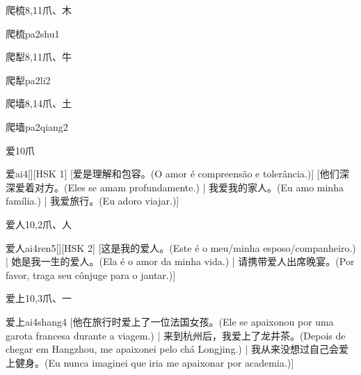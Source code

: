 \begin{entry}{爬梳}{8,11}{⽖、⽊}
  \begin{phonetics}{爬梳}{pa2shu1}
  \end{phonetics}
\end{entry}

\begin{entry}{爬犁}{8,11}{⽖、⽜}
  \begin{phonetics}{爬犁}{pa2li2}
  \end{phonetics}
\end{entry}

\begin{entry}{爬墙}{8,14}{⽖、⼟}
  \begin{phonetics}{爬墙}{pa2qiang2}
  \end{phonetics}
\end{entry}

\begin{entry}{爱}{10}{⽖}
  \begin{phonetics}{爱}{ai4}[][HSK 1]
    [爱是理解和包容。(O amor é compreensão e tolerância.)]
    [他们深深爱着对方。(Eles se amam profundamente.) | 我爱我的家人。(Eu amo minha família.) | 我爱旅行。(Eu adoro viajar.)]
  \end{phonetics}
\end{entry}

\begin{entry}{爱人}{10,2}{⽖、⼈}
  \begin{phonetics}{爱人}{ai4ren5}[][HSK 2]
    [这是我的爱人。(Este é o meu/minha esposo/companheiro.) | 她是我一生的爱人。(Ela é o amor da minha vida.) | 请携带爱人出席晚宴。(Por favor, traga seu cônjuge para o jantar.)]
  \end{phonetics}
\end{entry}

\begin{entry}{爱上}{10,3}{⽖、⼀}
  \begin{phonetics}{爱上}{ai4shang4}
    [他在旅行时爱上了一位法国女孩。(Ele se apaixonou por uma garota francesa durante a viagem.)  | 来到杭州后，我爱上了龙井茶。(Depois de chegar em Hangzhou, me apaixonei pelo chá Longjing.) | 我从来没想过自己会爱上健身。(Eu nunca imaginei que iria me apaixonar por academia.)]
  \end{phonetics}
\end{entry}

